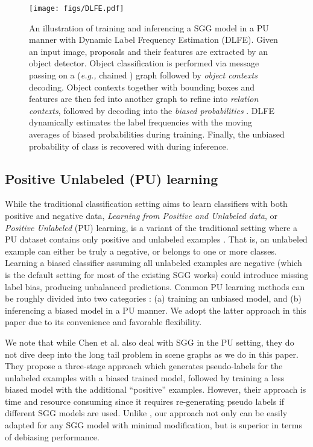\documentclass[sigconf]{acmart}
\begin{document}
\begin{figure*}[t!]
\begin{center}
\texttt{[image: figs/DLFE.pdf]}
\end{center}
\vspace{-1em}
  \caption{
  An illustration of training and inferencing a SGG model in a PU manner with Dynamic Label Frequency Estimation (DLFE).
  Given an input image, proposals and their features are extracted by an object detector. 
  Object classification is performed via message passing on a (\emph{e.g.,} chained \cite{zellers2018neural}) graph followed by \textit{object contexts} decoding.
  Object contexts together with bounding boxes and features are then fed into another graph to refine into \textit{relation contexts}, followed by decoding into the \textit{biased probabilities} .
  DLFE dynamically estimates the label frequencies  with the moving averages of biased probabilities during training.
  Finally, the unbiased probability of class  is recovered with  during inference.
    }
\label{fig:dlfe}
\vspace{-0.7em}
\end{figure*}

\subsection{Positive Unlabeled (PU) learning}
While the traditional classification setting aims to learn classifiers with both positive and negative data, \textit{Learning from Positive and Unlabeled data}, or \textit{Positive Unlabeled} (PU) learning, is a variant of the traditional setting where a PU dataset contains only positive and unlabeled examples \cite{denis2005learning,elkan2008learning,bekker2020learning}.
That is, an unlabeled example can either be truly a negative, or belongs to one or more classes.
Learning a biased classifier assuming all unlabeled examples are negative (which is the default setting for most of the existing SGG works) could introduce missing label bias, producing unbalanced predictions.
Common PU learning methods can be roughly divided into two categories \cite{bekker2020learning}: (a) training an unbiased model, and (b) inferencing a biased model in a PU manner.
We adopt the latter approach in this paper due to its convenience and favorable flexibility.

We note that while Chen et al. \cite{chen2019soft} also deal with SGG in the PU setting, they do not dive deep into the long tail problem in scene graphs as we do in this paper.
They propose a three-stage approach which generates pseudo-labels for the unlabeled examples with a biased trained model, followed by training a less biased model with the additional ``positive'' examples.
However, their approach is time and resource consuming since it requires re-generating pseudo labels if different SGG models are used.
Unlike \cite{chen2019soft}, our approach not only can be easily adapted for any SGG model with minimal modification, but is superior in terms of debiasing performance.
\end{document}
